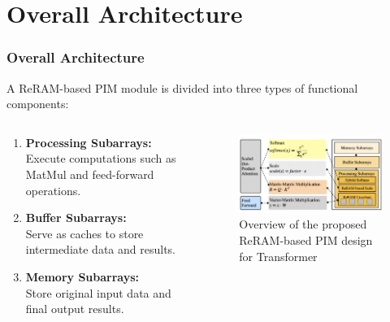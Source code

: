 \documentclass[
	12pt, %
]{beamer}
\begin{document}
\section{Overall Architecture}
\begin{frame}
	\frametitle{Overall Architecture}
	A ReRAM-based PIM module is divided into three types of functional components:
	\begin{columns}
		\begin{column}{0.5\textwidth}
			\begin{enumerate}
				\item 
				\textbf{Processing Subarrays:}\\
				Execute computations such as MatMul and feed-forward operations.
				
				\item 
				\textbf{Buffer Subarrays:}\\ 
				Serve as caches to store intermediate data and results.
				
				\item 
				\textbf{Memory Subarrays:}\\
				Store original input data and final output results.
			\end{enumerate}
		\end{column}
		
		\begin{column}{0.5\textwidth}
			\begin{figure}
				\includegraphics[width=6.3cm]{Images/img4.png}
				\caption{Overview of the proposed ReRAM-based PIM design for Transformer}
			\end{figure}
		\end{column}
	\end{columns}		
\end{frame}
\end{document}
